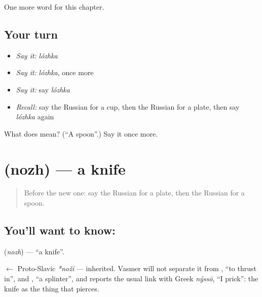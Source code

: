 \begin{grammarlens}[title={What you've built}]
One more word for this chapter.
\end{grammarlens}

\subsection*{Your turn}
\begin{itemize}
\raggedright
  \item \emph{Say it:} \emph{lózhka}
  \item \emph{Say it:} \emph{lózhka}, once more
  \item \emph{Say it:} say \emph{lózhka}
  \item \emph{Recall:} say the Russian for a cup, then the Russian for a plate, then say \emph{lózhka} again
\end{itemize}

\begin{tcolorbox}[breakable,colback=teal!4,colframe=teal!35!black,title={Before you move on}]
What does  mean? (\textquotedblleft{}A spoon\textquotedblright{}.) Say it once more.
\end{tcolorbox}
\section[\texorpdfstring{\ru{нож} (nozh)}{нож (nozh)}]{ (nozh) — a knife}

\label{lesson:RU-C51-knife}



\begin{quote}
Before the new one: say the Russian for a plate, then the Russian for a spoon.
\end{quote}

\subsection*{You'll want to know: }
\textbf{} (\emph{nozh}) — \textquotedblleft{}a knife\textquotedblright{}.

\begin{cousinweb}
\textbf{} $\leftarrow$ Proto-Slavic \emph{*nožĭ} — inherited. Vasmer will not separate it from \emph{}, \textquotedblleft{}to thrust in\textquotedblright{}, and \emph{}, \textquotedblleft{}a splinter\textquotedblright{}, and reports the usual link with Greek \emph{nýssō}, \textquotedblleft{}I prick\textquotedblright{}: the knife as the thing that pierces.
\end{cousinweb}

